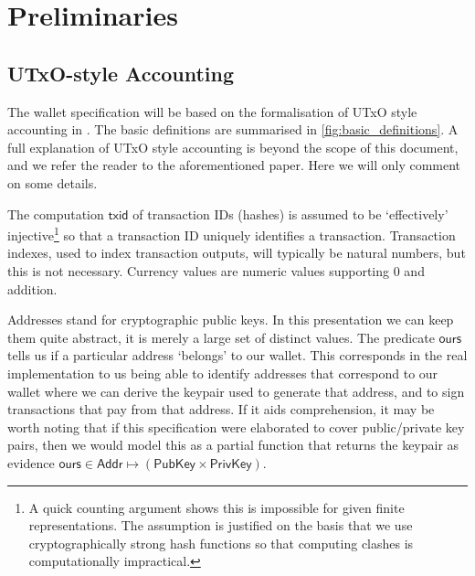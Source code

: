 \documentclass{article}
\theoremstyle{definition}{
  \newtheorem{lemma}{Lemma}[section] %
  \newtheorem{definition}[lemma]{Definition}
}
\theoremstyle{theorem}{
  \newtheorem{invariant}[lemma]{Invariant}
  \newtheorem{proofobligation}[lemma]{Proof Obligation}
}
\numberwithin{equation}{lemma}
\begin{document}

\pagebreak

\section{Preliminaries}

\subsection{UTxO-style Accounting}

The wallet specification will be based on the formalisation of UTxO style
accounting in \citep{utxo_accounting}. The basic definitions are summarised in
\cref{fig:basic_definitions}. A full explanation of UTxO style accounting
is beyond the scope of this document, and we refer the reader to the
aforementioned paper. Here we will only comment on some details.

The computation $\mathsf{txid}$ of transaction IDs (hashes) is assumed to be
`effectively' injective\footnote{A quick counting argument shows this is
impossible for given finite representations. The assumption is justified on the
basis that we use cryptographically strong hash functions so that computing
clashes is computationally impractical.} so that a transaction ID uniquely
identifies a transaction. Transaction indexes, used to index transaction
outputs, will typically be natural numbers, but this is not necessary. Currency
values are numeric values supporting 0 and addition.

Addresses stand for cryptographic public keys. In this presentation we can keep
them quite abstract, it is merely a large set of distinct values. The predicate
$\mathsf{ours}$ tells us if a particular address `belongs' to our wallet.
This corresponds in the real implementation to us being able to identify
addresses that correspond to our wallet where we can derive the keypair used
to generate that address, and to sign transactions that pay from that address.
If it aids comprehension, it may be worth noting that if this specification
were elaborated to cover public/private key pairs, then we would model this as
a partial function that returns the keypair as evidence
$\mathsf{ours} \in \mathsf{Addr} \mapsto (\mathsf{PubKey} \times \mathsf{PrivKey})$.
\end{document}
